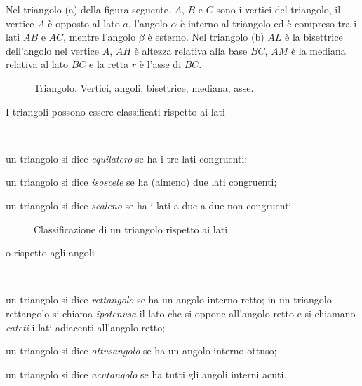 Nel triangolo (a) della figura seguente, \(A\), \(B\) e \(C\) sono i 
vertici del triangolo, il vertice \(A\) è opposto al lato \(a\), l'angolo 
\(\alpha\) è interno al triangolo ed è compreso tra i lati \(AB\) e \(AC\), 
mentre l'angolo \(\beta\) è esterno. Nel triangolo (b) \(AL\) è la 
bisettrice dell'angolo nel vertice \(A\), \(AH\) è altezza relativa alla 
base \(BC\), \(AM\) è la mediana relativa al lato \(BC\) e la retta \(r\) è 
l'asse di \(BC\).


\begin{inaccessibleblock}
 \begin{figure}[htb]
\centering
\caption{Triangolo. Vertici, angoli, bisettrice, mediana, asse.}
\label{fig:triangolo1}
\end{figure}
\end{inaccessibleblock}

I triangoli possono essere classificati rispetto ai lati
\begin{definizione}~
\begin{itemize*}
\item un triangolo si dice \emph{equilatero} se ha i tre lati 
congruenti;
\item un triangolo si dice \emph{isoscele} se ha (almeno) due lati 
congruenti;
\item un triangolo si dice \emph{scaleno} se ha i lati a due a due 
non congruenti.
\end{itemize*}
\end{definizione}


\begin{inaccessibleblock}
 \begin{figure}[htb]
\centering
\caption{Classificazione di un triangolo rispetto ai 
lati}\label{fig:class_triangolo_lati}
\end{figure}
\end{inaccessibleblock}

\noindent o rispetto agli angoli
\begin{definizione}~
\begin{itemize*}
\item un triangolo si dice \emph{rettangolo} se ha un angolo interno 
retto; in un triangolo rettangolo si chiama \emph{ipotenusa} il lato 
che si oppone all'angolo retto e si chiamano \emph{cateti} i lati 
adiacenti all'angolo retto;
\item un triangolo si dice \emph{ottusangolo} se ha un angolo interno 
ottuso;
\item un triangolo si dice \emph{acutangolo} se ha tutti gli angoli 
interni acuti.
\end{itemize*}
\end{definizione}



